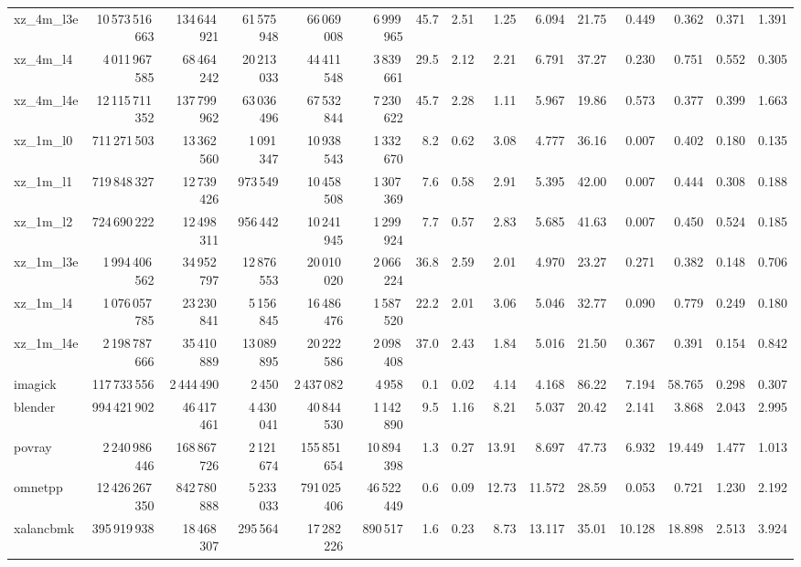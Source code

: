 \documentclass[9pt,landscape,a4paper]{article}
\begin{document}
\begin{adjustbox}{max width=\textwidth, max totalheight=0.50\textheight}
\begin{tabular}{lrrrrrrrrrrrrrr}
xz\_4m\_l3e & 10\,573\,516\,663 & 134\,644\,921 & 61\,575\,948 & 66\,069\,008 & 6\,999\,965 & 45.7 & 2.51 & 1.25 & 6.094 & 21.75 & 0.449 & 0.362 & 0.371 & 1.391 \\
xz\_4m\_l4 & 4\,011\,967\,585 & 68\,464\,242 & 20\,213\,033 & 44\,411\,548 & 3\,839\,661 & 29.5 & 2.12 & 2.21 & 6.791 & 37.27 & 0.230 & 0.751 & 0.552 & 0.305 \\
xz\_4m\_l4e & 12\,115\,711\,352 & 137\,799\,962 & 63\,036\,496 & 67\,532\,844 & 7\,230\,622 & 45.7 & 2.28 & 1.11 & 5.967 & 19.86 & 0.573 & 0.377 & 0.399 & 1.663 \\
xz\_1m\_l0 & 711\,271\,503 & 13\,362\,560 & 1\,091\,347 & 10\,938\,543 & 1\,332\,670 & 8.2 & 0.62 & 3.08 & 4.777 & 36.16 & 0.007 & 0.402 & 0.180 & 0.135 \\
xz\_1m\_l1 & 719\,848\,327 & 12\,739\,426 & 973\,549 & 10\,458\,508 & 1\,307\,369 & 7.6 & 0.58 & 2.91 & 5.395 & 42.00 & 0.007 & 0.444 & 0.308 & 0.188 \\
xz\_1m\_l2 & 724\,690\,222 & 12\,498\,311 & 956\,442 & 10\,241\,945 & 1\,299\,924 & 7.7 & 0.57 & 2.83 & 5.685 & 41.63 & 0.007 & 0.450 & 0.524 & 0.185 \\
xz\_1m\_l3e & 1\,994\,406\,562 & 34\,952\,797 & 12\,876\,553 & 20\,010\,020 & 2\,066\,224 & 36.8 & 2.59 & 2.01 & 4.970 & 23.27 & 0.271 & 0.382 & 0.148 & 0.706 \\
xz\_1m\_l4 & 1\,076\,057\,785 & 23\,230\,841 & 5\,156\,845 & 16\,486\,476 & 1\,587\,520 & 22.2 & 2.01 & 3.06 & 5.046 & 32.77 & 0.090 & 0.779 & 0.249 & 0.180 \\
xz\_1m\_l4e & 2\,198\,787\,666 & 35\,410\,889 & 13\,089\,895 & 20\,222\,586 & 2\,098\,408 & 37.0 & 2.43 & 1.84 & 5.016 & 21.50 & 0.367 & 0.391 & 0.154 & 0.842 \\
imagick & 117\,733\,556 & 2\,444\,490 & 2\,450 & 2\,437\,082 & 4\,958 & 0.1 & 0.02 & 4.14 & 4.168 & 86.22 & 7.194 & 58.765 & 0.298 & 0.307 \\
blender & 994\,421\,902 & 46\,417\,461 & 4\,430\,041 & 40\,844\,530 & 1\,142\,890 & 9.5 & 1.16 & 8.21 & 5.037 & 20.42 & 2.141 & 3.868 & 2.043 & 2.995 \\
povray & 2\,240\,986\,446 & 168\,867\,726 & 2\,121\,674 & 155\,851\,654 & 10\,894\,398 & 1.3 & 0.27 & 13.91 & 8.697 & 47.73 & 6.932 & 19.449 & 1.477 & 1.013 \\
omnetpp & 12\,426\,267\,350 & 842\,780\,888 & 5\,233\,033 & 791\,025\,406 & 46\,522\,449 & 0.6 & 0.09 & 12.73 & 11.572 & 28.59 & 0.053 & 0.721 & 1.230 & 2.192 \\
xalancbmk & 395\,919\,938 & 18\,468\,307 & 295\,564 & 17\,282\,226 & 890\,517 & 1.6 & 0.23 & 8.73 & 13.117 & 35.01 & 10.128 & 18.898 & 2.513 & 3.924 \\

\end{tabular}
\end{adjustbox}
\end{document}
